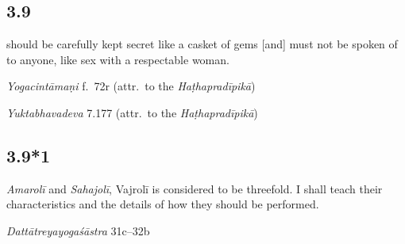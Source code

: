 \begin{ekdosis}

\subsection*{3.9}
\begin{translation}[hp03_009]
[\ldots] should be carefully kept secret like a casket of gems [and] must not be spoken of to anyone, like sex with a respectable woman.
\end{translation}

\begin{sources}[hp03_009]
\end{sources}

\begin{testimonia}[hp03_009]
\emph{Yogacintāmaṇi} f.~72r (attr.~to the \emph{Haṭhapradīpikā})
\begin{versinnote}
\end{versinnote}

\emph{Yuktabhavadeva} 7.177 (attr.~to the \emph{Haṭhapradīpikā})
\begin{versinnote}
\end{versinnote}
\end{testimonia}


\subsection*{3.9*1}
\begin{translation}[hp03_009_1]
[With] \emph{Amarolī} and \emph{Sahajolī}, Vajrolī is considered to be threefold. I shall teach their characteristics and the details of how they should be performed.
\end{translation}

\begin{sources}[hp03_009_1]
\emph{Dattātreyayogaśāstra} 31c–32b
\begin{versinnote}
\tl{\var{vajrolī ] vajrolir \vl • cāmarolī ] amaroliś \vl • sahajolī ] sahajolis \vl}\\!}
\end{versinnote}
\end{sources}



\end{ekdosis}
